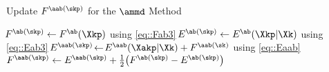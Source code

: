 \begin{algorithm}[t]
	\caption{Update $F^{\aab(\skp)}$ for the $\ammd$ Method}
	\label{algorithm::amm_phi}
	\begin{algorithmic}[1]
	\State $\!F^{\ab(\skp)}\gets F^{\ab}(\Xkp)$ using \cref{eq::Fab3}\label{line::alg7::Fabkp}
	\vspace{0.1em}
	\State $\!E^{\ab(\skp)}\gets E^{\ab}(\Xkp|\Xk)$ using \cref{eq::Eab3}\label{line::alg7::Eabkp}
	\vspace{0.1em}
	\State $\!E^{\aab(\skp)} \!\gets\!  E^{\aab}(\Xakp|\Xk) + F^{\aab(\sk)}$ using \cref{eq::Eaab}\label{line::alg7::Eaabkp}
	\vspace{-0.75em}
	\State $F^{\aab(\skp)}\gets E^{\aab(\skp)} + \frac{1}{2}\big(F^{\ab(\skp)}-E^{\ab(\skp)}\big)$\label{line::alg7::Faabkp}
	\end{algorithmic}
\end{algorithm}